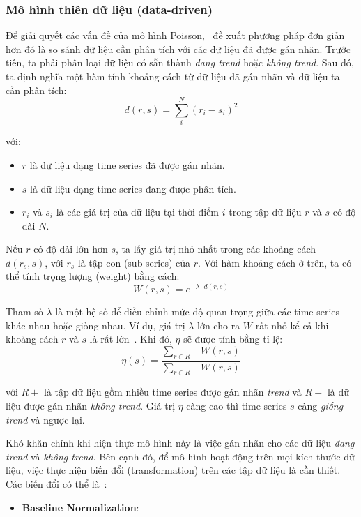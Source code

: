 \subsubsection{Mô hình thiên dữ liệu (data-driven)}
Để giải quyết các vấn đề của mô hình Poisson,
\cite{hendricksonTrendDetectionSocial2015}~đề xuất phương pháp đơn giản hơn đó
là so sánh dữ liệu cần phân tích với các dữ liệu đã được gán nhãn. Trước tiên,
ta phải phân loại dữ liệu có sẵn thành \textit{đang trend} hoặc \textit{không
trend}. Sau đó, ta định nghĩa một hàm tính khoảng cách từ dữ liệu đã gán nhãn
và dữ liệu ta cần phân tích:
\[ d(r, s)=\sum_{i}^{N}\left(r_{i}-s_{i}\right)^{2} \]

với:
\begin{itemize}
	\item $r$ là dữ liệu dạng time series đã được gán nhãn.
	\item $s$ là dữ liệu dạng time series đang được phân tích.
	\item $r_{i}$ và $s_{i}$ là các giá trị của dữ liệu tại thời điểm $i$ trong
	tập dữ liệu $r$ và $s$ có độ dài $N$.
\end{itemize}

Nếu $r$ có độ dài lớn hơn $s$, ta lấy giá trị nhỏ nhất trong các khoảng cách
$d(r_s, s)$, với $r_s$ là tập con (sub-series) của $r$. Với hàm khoảng cách ở
trên, ta có thể tính trọng lượng (weight) bằng cách:
\[ W(r,s)=e^{-\lambda \cdot d(r,s)} \]

Tham số $\lambda$ là một hệ số để điều chỉnh mức độ quan trọng giữa các time
series khác nhau hoặc giống nhau. Ví dụ, giá trị $\lambda$ lớn cho ra $W$ rất
nhỏ kể cả khi khoảng cách $r$ và $s$ là rất
lớn~\cite{hendricksonTrendDetectionSocial2015}. Khi đó, $\eta$ sẽ được tính
bằng tỉ lệ:
\[
\eta(s)=\frac{\sum_{r \in R+} W(r, s)}{\sum_{r \in R-} W(r, s)}
\]

với $R+$ là tập dữ liệu gồm nhiều time series được gán nhãn \textit{trend} và
$R-$ là dữ liệu được gán nhãn \textit{không trend}. Giá trị $\eta$ càng cao thì
time series $s$ càng \textit{giống trend} và ngược lại.

Khó khăn chính khi hiện thực mô hình này là việc gán nhãn cho các dữ liệu
\textit{đang trend} và \textit{không trend}. Bên cạnh đó, để mô hình hoạt động
trên mọi kích thước dữ liệu, việc thực hiện biến đổi (transformation) trên các
tập dữ liệu là cần thiết. Các biến đổi có thể là~\cite{nikolovTrendNoTrend2012}:

\begin{itemize}
	\item \textbf{Baseline Normalization}: 
\end{itemize}


